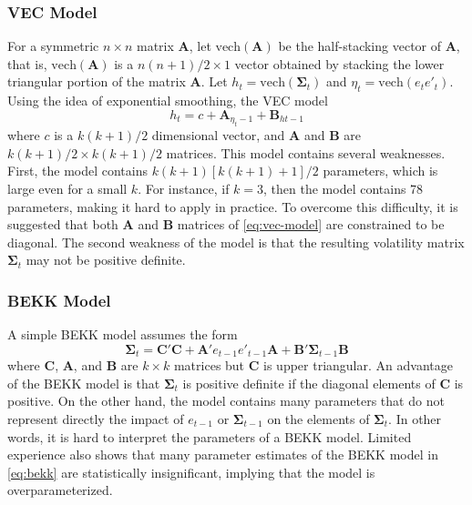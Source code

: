 \subsubsection{VEC Model} For a symmetric $n \times n$ matrix $\mathbf{A}$, let $\text{vech}(\mathbf{A})$ be the half-stacking vector of $\mathbf{A}$, that is, $\text{vech}(\mathbf{A})$ is a $n(n +1)/2 \times 1$ vector obtained by stacking the lower triangular portion of the matrix $\mathbf{A}$. Let $h_t = \text{vech}(\mathbf{\Sigma}_t)$ and $\eta_t = \text{vech}(e_t e'_t)$. Using the idea of exponential smoothing, the VEC model
\begin{equation}
h_t = c + \mathbf{A}_{\eta_t-1} + \mathbf{B}_{ht-1}
\label{eq:vec-model}
\end{equation}
where $c$ is a $k(k + 1)/2$ dimensional vector, and $\mathbf{A}$ and $\mathbf{B}$ are $k(k + 1)/2 \times k(k + 1)/2$ matrices. This model contains several weaknesses. First, the model contains $k(k + 1)[k(k + 1) + 1]/2$ parameters, which is large even for a small $k$. For instance, if 
$k = 3$, then the model contains 78 parameters, making it hard to apply in practice. To overcome this difficulty, it is suggested that both $\mathbf{A}$ and $\mathbf{B}$ matrices of \eqref{eq:vec-model} are constrained to be diagonal. The second weakness of the model is that the resulting volatility matrix $\mathbf{\Sigma}_t$ may not be positive definite.

\subsubsection{BEKK Model}
A simple BEKK model assumes the form
\begin{equation}
\mathbf{\Sigma}_t = \mathbf{C}'\mathbf{C} + \mathbf{A}' e_{t-1} e'_{t-1} \mathbf{A}+\mathbf{B}' \mathbf{\Sigma}_{t-1} \mathbf{B}
\label{eq:bekk}
\end{equation}
where $\mathbf{C}$, $\mathbf{A}$, and $\mathbf{B}$ are $k \times k$ matrices but $\mathbf{C}$ is upper triangular. An advantage of the BEKK model is that $\mathbf{\Sigma}_t$ is positive definite if the diagonal elements of $\mathbf{C}$ is positive. On the other hand, the model contains many parameters that do not represent directly the impact of $e_{t-1}$ or $\mathbf{\Sigma}_{t-1}$ on the elements of $\mathbf{\Sigma}_t$. In other words, it is 
hard to interpret the parameters of a BEKK model. Limited experience also shows that many parameter estimates of the BEKK model in \eqref{eq:bekk} are statistically insignificant, implying that the model is overparameterized. 

